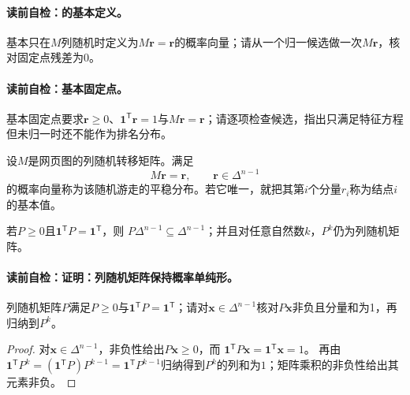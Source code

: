 \paragraph{读前自检：\PageRank{}的基本定义。}基本\PageRank{}只在$M$列随机时定义为$M\boldsymbol r=\boldsymbol r$的概率向量；请从一个归一候选做一次$M\boldsymbol r$，核对固定点残差为0。\par
\paragraph{读前自检：基本\PageRank{}固定点。}基本\PageRank{}固定点要求$\boldsymbol r\ge0$、$\boldsymbol1^{\mathsf T}\boldsymbol r=1$与$M\boldsymbol r=\boldsymbol r$；请逐项检查候选，指出只满足特征方程但未归一时还不能作为排名分布。\par


\begin{definition}[基本\PageRank{}]\label{def:V5-C07-basic}
设$M$是网页图的列随机转移矩阵。满足
\begin{equation}
M\boldsymbol r=\boldsymbol r,\qquad
\boldsymbol r\in\Delta^{n-1}
\label{eq:V5-C07-basic-fixed}
\end{equation}
的概率向量称为该随机游走的平稳分布。若它唯一，就把其第$i$个分量$r_i$称为结点$i$的基本\PageRank{}值。
\end{definition}

\begin{proposition}[列随机矩阵保持概率单纯形]\label{prop:V5-C07-simplex-invariance}
若$P\ge0$且$\boldsymbol1^{\mathsf T}P=\boldsymbol1^{\mathsf T}$，则
$P\Delta^{n-1}\subseteq\Delta^{n-1}$；并且对任意自然数$k$，$P^k$仍为列随机矩阵。
\end{proposition}
\paragraph{读前自检：证明：列随机矩阵保持概率单纯形。}列随机矩阵$P$满足$P\ge0$与$\boldsymbol1^{\mathsf T}P=\boldsymbol1^{\mathsf T}$；请对$\boldsymbol x\in\Delta^{n-1}$核对$P\boldsymbol x$非负且分量和为1，再归纳到$P^k$。\par

\begin{proof}
对$\boldsymbol x\in\Delta^{n-1}$，非负性给出$P\boldsymbol x\ge0$，而
$\boldsymbol1^{\mathsf T}P\boldsymbol x=\boldsymbol1^{\mathsf T}\boldsymbol x=1$。
再由$\boldsymbol1^{\mathsf T}P^k=(\boldsymbol1^{\mathsf T}P)P^{k-1}
=\boldsymbol1^{\mathsf T}P^{k-1}$归纳得到$P^k$的列和为$1$；矩阵乘积的非负性给出其元素非负。
\end{proof}

